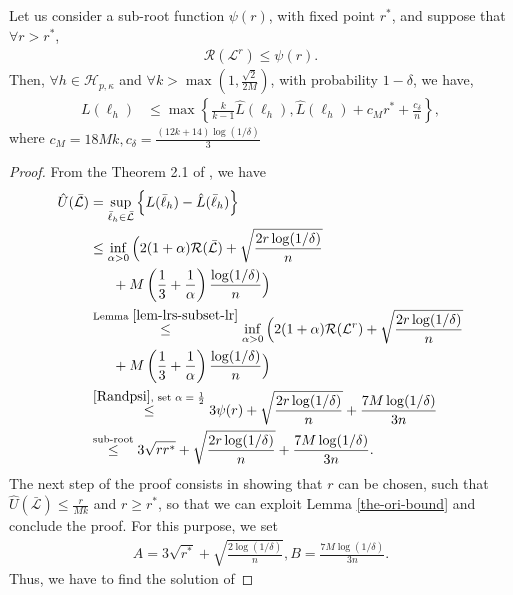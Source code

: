 \documentclass[10pt]{llncs}
\begin{document}
\begin{theorem}
\label{the-fixedpoint}
Let us consider a sub-root function $\psi(r)$, with fixed point $r^\ast$,
and suppose that $\forall r>r^\ast$,
  \begin{align}
  \label{Randpsi}
    \mathcal{R}(\mathcal{L}^r)\leq \psi(r).
  \end{align}
  Then, $\forall h\in\mathcal{H}_{p,\kappa}$ and $\forall k>\max(1,\frac{\sqrt{2}}{2M})$, with probability
  $1-\delta$, we have,
  \begin{align*}
   L(\ell_h)&\leq \max\left\{
        \frac{k}{k-1}\hat{L}(\ell_h),
       \hat{L}(\ell_h)+c_Mr^\ast+\frac{c_{\delta}}{n}
     \right\},
\end{align*}
where $c_M=18Mk, c_{\delta}=\frac{(12k+14)\log(1/\delta)}{3}$
\end{theorem}
\begin{proof}
  From the Theorem 2.1 of \cite{Bartlett2005lrc},
  we have
  \begin{align*}
    \hat{U}(\bar{\mathcal{L}})&=\sup_{\bar{\ell}_h\in\bar{\mathcal{L}}}\left\{L(\bar{\ell}_h)-\hat{L}(\bar{\ell}_h)\right\}\\
    &\leq \inf_{\alpha>0}\Big(2(1+\alpha)\mathcal{R}(\bar{\mathcal{L}})+
    \sqrt{\frac{2r\log(1/\delta)}{n}}\\&~~~~~+M\left(\frac{1}{3}+\frac{1}{\alpha}\right)\frac{\log(1/\delta)}{n}\Big)\\
    &\overset{\text{Lemma }\ref{lem-lrs-subset-lr}}{\leq}
    \inf_{\alpha>0}\Big(2(1+\alpha)\mathcal{R}(\mathcal{L}^r)+
    \sqrt{\frac{2r\log(1/\delta)}{n}}\\&~~~~~+M\left(\frac{1}{3}+\frac{1}{\alpha}\right)\frac{\log(1/\delta)}{n}\Big)\\
    &\overset{\eqref{Randpsi}, \text{ set $\alpha=\frac{1}{2}$}}{\leq} 3\psi(r)+\sqrt{\frac{2r\log(1/\delta)}{n}}+\frac{7M\log(1/\delta)}{3n}\\
    &\overset{\text{sub-root}}{\leq} 3\sqrt{rr^\ast}+\sqrt{\frac{2r\log(1/\delta)}{n}}+\frac{7M\log(1/\delta)}{3n}.
  \end{align*}
  The next step of the proof consists in showing that $r$ can be chosen,
  such that $\hat{U}(\bar{\mathcal{L}})\leq \frac{r}{Mk}$ and $r\geq r^\ast$,
  so that we can exploit Lemma \ref{the-ori-bound}
  and conclude the proof.
  For this purpose,
we set
\begin{align*}
  A=3\sqrt{r^\ast}+\sqrt{\frac{2\log(1/\delta)}{n}},
  B= \frac{7M\log(1/\delta)}{3n}.
\end{align*}
Thus, we have to find the solution of

\end{proof}
\end{document}
